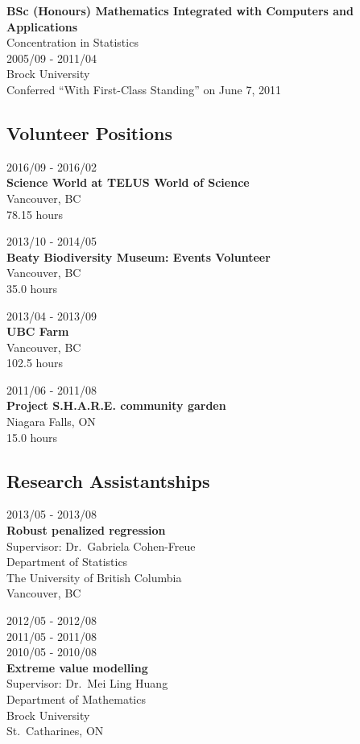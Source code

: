 \documentclass[]{book}
\begin{document}
\textbf{BSc (Honours) Mathematics Integrated with Computers and Applications}\\
Concentration in Statistics\\
2005/09 - 2011/04\\
Brock University\\
Conferred ``With First-Class Standing'' on June 7, 2011

\hypertarget{volunteer-positions}{%
\subsection{Volunteer Positions}\label{volunteer-positions}}

2016/09 - 2016/02\\
\textbf{Science World at TELUS World of Science }\\
Vancouver, BC\\
78.15 hours

2013/10 - 2014/05\\
\textbf{Beaty Biodiversity Museum: Events Volunteer}\\
Vancouver, BC\\
35.0 hours

2013/04 - 2013/09\\
\textbf{UBC Farm}\\
Vancouver, BC\\
102.5 hours

2011/06 - 2011/08\\
\textbf{Project S.H.A.R.E. community garden}\\
Niagara Falls, ON\\
15.0 hours

\hypertarget{research-assistantships}{%
\subsection{Research Assistantships}\label{research-assistantships}}

2013/05 - 2013/08\\
\textbf{Robust penalized regression}\\
Supervisor: Dr.~Gabriela Cohen-Freue\\
Department of Statistics\\
The University of British Columbia\\
Vancouver, BC

2012/05 - 2012/08\\
2011/05 - 2011/08\\
2010/05 - 2010/08\\
\textbf{Extreme value modelling}\\
Supervisor: Dr.~Mei Ling Huang\\
Department of Mathematics\\
Brock University\\
St.~Catharines, ON
\end{document}
